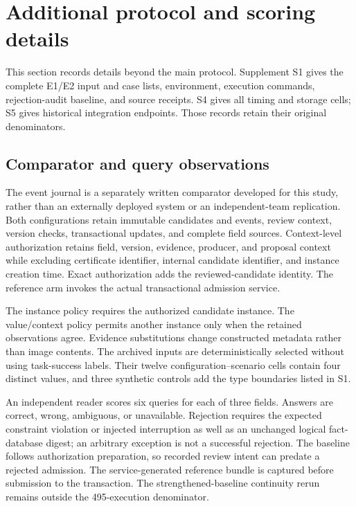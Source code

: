 \section{Additional protocol and scoring details}
\label{app:detailed-protocol}

This section records details beyond the main protocol. Supplement S1 gives the complete E1/E2 input and case lists, environment, execution commands, rejection-audit baseline, and source receipts. S4 gives all timing and storage cells; S5 gives historical integration endpoints. Those records retain their original denominators.

\subsection{Comparator and query observations}

The event journal is a separately written  comparator developed for this study, rather than an externally deployed system or an independent-team replication. Both configurations retain immutable candidates and events, review context, version checks, transactional updates, and complete field sources. Context-level authorization retains field, version, evidence, producer, and proposal context while excluding certificate identifier, internal candidate identifier, and instance creation time. Exact authorization adds the reviewed-candidate identity. The reference arm invokes the actual transactional admission service.

The instance policy requires the authorized candidate instance. The value/context policy permits another instance only when the retained observations agree. Evidence substitutions change constructed metadata rather than image contents. The archived inputs are deterministically selected without using task-success labels. Their twelve configuration--scenario cells contain four distinct values, and three synthetic controls add the type boundaries listed in S1.

An independent reader scores six queries for each of three fields. Answers are correct, wrong, ambiguous, or unavailable. Rejection requires the expected constraint violation or injected interruption as well as an unchanged logical fact-database digest; an arbitrary exception is not a successful rejection. The baseline follows authorization preparation, so recorded review intent can predate a rejected admission. The service-generated reference bundle is captured before submission to the transaction. The strengthened-baseline continuity rerun remains outside the 495-execution denominator.

